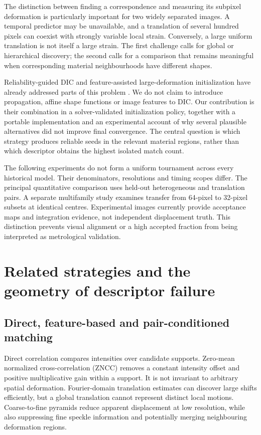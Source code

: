 \documentclass[11pt,a4paper]{article}
\begin{document}
The distinction between finding a correspondence and measuring its subpixel deformation is particularly important for two widely separated images. A temporal predictor may be unavailable, and a translation of several hundred pixels can coexist with strongly variable local strain. Conversely, a large uniform translation is not itself a large strain. The first challenge calls for global or hierarchical discovery; the second calls for a comparison that remains meaningful when corresponding material neighbourhoods have different shapes.

Reliability-guided DIC and feature-assisted large-deformation initialization have already addressed parts of this problem \citep{zhou,pan,li}. We do not claim to introduce propagation, affine shape functions or image features to DIC. Our contribution is their combination in a solver-validated initialization policy, together with a portable implementation and an experimental account of why several plausible alternatives did not improve final convergence. The central question is which strategy produces reliable seeds in the relevant material regions, rather than which descriptor obtains the highest isolated match count.

The following experiments do not form a uniform tournament across every historical model. Their denominators, resolutions and timing scopes differ. The principal quantitative comparison uses held-out heterogeneous and translation pairs. A separate multifamily study examines transfer from 64-pixel to 32-pixel subsets at identical centres. Experimental images currently provide acceptance maps and integration evidence, not independent displacement truth. This distinction prevents visual alignment or a high accepted fraction from being interpreted as metrological validation.

\section{Related strategies and the geometry of descriptor failure}
\subsection{Direct, feature-based and pair-conditioned matching}
Direct correlation compares intensities over candidate supports. Zero-mean normalized cross-correlation (ZNCC) removes a constant intensity offset and positive multiplicative gain within a support. It is not invariant to arbitrary spatial deformation. Fourier-domain translation estimates can discover large shifts efficiently, but a global translation cannot represent distinct local motions. Coarse-to-fine pyramids reduce apparent displacement at low resolution, while also suppressing fine speckle information and potentially merging neighbouring deformation regions.
\end{document}

